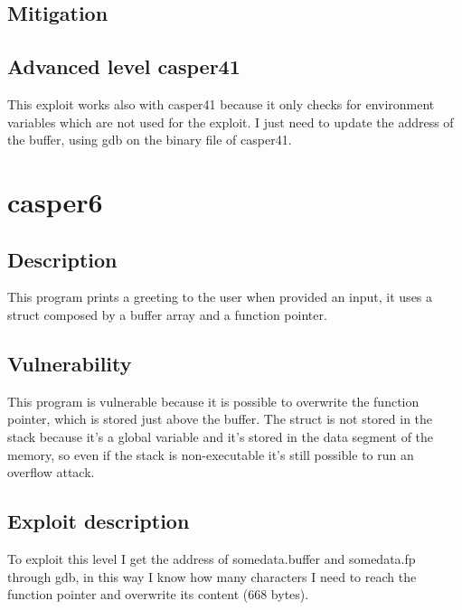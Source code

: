 \documentclass[a4paper,12pt]{article}
\begin{document}

\subsection{Mitigation}

\subsection{Advanced level casper41}

This exploit works also with casper41 because it only checks for environment variables which are not used for the exploit. I just need to update the address of the buffer, using gdb on the binary file of casper41.



\section{casper6}


\subsection{Description}

This program prints a greeting to the user when provided an input, it uses a struct composed by a buffer array and a function pointer.

\subsection{Vulnerability}

This program is vulnerable because it is possible to overwrite the function pointer, which is stored just above the buffer.  The struct is not stored in the stack because it's a global variable and it's stored in the data segment of the memory, so even if the stack is non-executable it's still possible to run an overflow attack.


\subsection{Exploit description}

To exploit this level I get the address of somedata.buffer and somedata.fp through gdb, in this way I know how many characters I need to reach the function pointer and overwrite its content (668 bytes).
\end{document}
